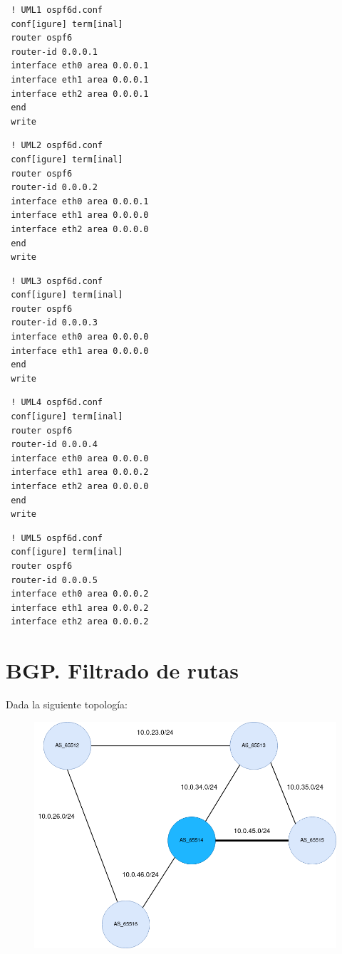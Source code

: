 \documentclass{article}
\begin{document}
\begin{verbatim}
 ! UML1 ospf6d.conf
 conf[igure] term[inal]
 router ospf6
 router-id 0.0.0.1
 interface eth0 area 0.0.0.1
 interface eth1 area 0.0.0.1
 interface eth2 area 0.0.0.1
 end
 write
\end{verbatim}

\begin{verbatim}
 ! UML2 ospf6d.conf
 conf[igure] term[inal]
 router ospf6
 router-id 0.0.0.2
 interface eth0 area 0.0.0.1
 interface eth1 area 0.0.0.0
 interface eth2 area 0.0.0.0
 end
 write
\end{verbatim}

\begin{verbatim}
 ! UML3 ospf6d.conf
 conf[igure] term[inal]
 router ospf6
 router-id 0.0.0.3
 interface eth0 area 0.0.0.0
 interface eth1 area 0.0.0.0
 end
 write
\end{verbatim}

\begin{verbatim}
 ! UML4 ospf6d.conf
 conf[igure] term[inal]
 router ospf6
 router-id 0.0.0.4
 interface eth0 area 0.0.0.0
 interface eth1 area 0.0.0.2
 interface eth2 area 0.0.0.0
 end
 write
\end{verbatim}

\begin{verbatim}
 ! UML5 ospf6d.conf
 conf[igure] term[inal]
 router ospf6
 router-id 0.0.0.5
 interface eth0 area 0.0.0.2
 interface eth1 area 0.0.0.2
 interface eth2 area 0.0.0.2
\end{verbatim}

\newpage

\section{BGP. Filtrado de rutas}

  Dada la siguiente topología:
  \begin{figure}[h]
    \includegraphics[width=\textwidth]{route-map.png}
  \end{figure}
\end{document}
